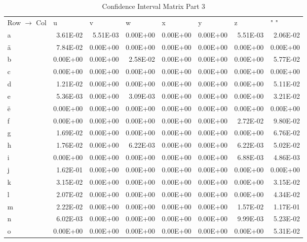 \documentclass[11pt,a4paper]{CLabBookTemplate} %
\begin{document}
\begin{table}[htbp]
	\centering
	\caption{Confidence Interval Matrix Part 3}
	\begin{tabular}{lrrrrrrr}
		Row $\rightarrow$ Col & \multicolumn{1}{l}{u} & \multicolumn{1}{l}{v} & \multicolumn{1}{l}{w} & \multicolumn{1}{l}{x} & \multicolumn{1}{l}{y} & \multicolumn{1}{l}{z} & \multicolumn{1}{l}{" "} \\
		a     & 3.61E-02 & 5.51E-03 & 0.00E+00 & 0.00E+00 & 0.00E+00 & 5.51E-03 & 2.06E-02 \\
		ä     & 7.84E-02 & 0.00E+00 & 0.00E+00 & 0.00E+00 & 0.00E+00 & 0.00E+00 & 0.00E+00 \\
		b     & 0.00E+00 & 0.00E+00 & 2.58E-02 & 0.00E+00 & 0.00E+00 & 0.00E+00 & 5.77E-02 \\
		c     & 0.00E+00 & 0.00E+00 & 0.00E+00 & 0.00E+00 & 0.00E+00 & 0.00E+00 & 0.00E+00 \\
		d     & 1.21E-02 & 0.00E+00 & 0.00E+00 & 0.00E+00 & 0.00E+00 & 0.00E+00 & 5.11E-02 \\
		e     & 5.36E-03 & 0.00E+00 & 3.09E-03 & 0.00E+00 & 0.00E+00 & 0.00E+00 & 3.21E-02 \\
		ë     & 0.00E+00 & 0.00E+00 & 0.00E+00 & 0.00E+00 & 0.00E+00 & 0.00E+00 & 0.00E+00 \\
		f     & 0.00E+00 & 0.00E+00 & 0.00E+00 & 0.00E+00 & 0.00E+00 & 2.72E-02 & 9.80E-02 \\
		g     & 1.69E-02 & 0.00E+00 & 0.00E+00 & 0.00E+00 & 0.00E+00 & 0.00E+00 & 6.76E-02 \\
		h     & 1.76E-02 & 0.00E+00 & 6.22E-03 & 0.00E+00 & 0.00E+00 & 6.22E-03 & 5.02E-02 \\
		i     & 0.00E+00 & 0.00E+00 & 0.00E+00 & 0.00E+00 & 0.00E+00 & 6.88E-03 & 4.86E-03 \\
		j     & 1.62E-01 & 0.00E+00 & 0.00E+00 & 0.00E+00 & 0.00E+00 & 0.00E+00 & 0.00E+00 \\
		k     & 3.15E-02 & 0.00E+00 & 0.00E+00 & 0.00E+00 & 0.00E+00 & 0.00E+00 & 3.15E-02 \\
		l     & 2.07E-02 & 0.00E+00 & 0.00E+00 & 0.00E+00 & 0.00E+00 & 0.00E+00 & 4.34E-02 \\
		m     & 2.22E-02 & 0.00E+00 & 0.00E+00 & 0.00E+00 & 0.00E+00 & 1.57E-02 & 1.17E-01 \\
		n     & 6.02E-03 & 0.00E+00 & 0.00E+00 & 0.00E+00 & 0.00E+00 & 9.99E-03 & 5.23E-02 \\
		o     & 0.00E+00 & 0.00E+00 & 0.00E+00 & 0.00E+00 & 0.00E+00 & 0.00E+00 & 5.31E-02 \\

\end{tabular}
\end{table}
\end{document}
